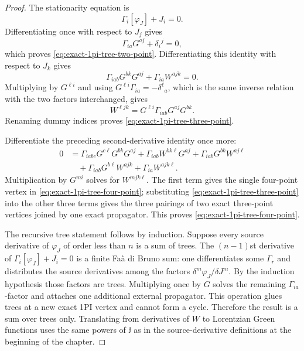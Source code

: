 \begin{proof}
The stationarity equation is
\[
  \Gamma_i[\varphi_J]+J_i=0.
\]
Differentiating once with respect to \(J_j\) gives
\[
  \Gamma_{ia}G^{aj}+\delta_i{}^j=0,
\]
which proves \eqref{eq:exact-1pi-tree-two-point}.  Differentiating this
identity with respect to \(J_k\) gives
\[
  \Gamma_{iab}G^{bk}G^{aj}
  +
  \Gamma_{ia}W^{ajk}
  =
  0 .
\]
Multiplying by \(G^{\ell i}\) and using
\(G^{\ell i}\Gamma_{ia}=-\delta^\ell{}_a\), which is the same inverse
relation with the two factors interchanged, gives
\[
  W^{\ell jk}
  =
  G^{\ell i}\Gamma_{iab}G^{aj}G^{bk}.
\]
Renaming dummy indices proves
\eqref{eq:exact-1pi-tree-three-point}.

Differentiate the preceding second-derivative identity once more:
\[
\begin{aligned}
  0
  &=
  \Gamma_{iabc}G^{c\ell}G^{bk}G^{aj}
  +
  \Gamma_{iab}W^{bk\ell}G^{aj}
  +
  \Gamma_{iab}G^{bk}W^{aj\ell}
\\
  &\quad
  +
  \Gamma_{iab}G^{b\ell}W^{ajk}
  +
  \Gamma_{ia}W^{ajk\ell}.
\end{aligned}
\]
Multiplication by \(G^{mi}\) solves for \(W^{mjk\ell}\).  The first term gives
the single four-point vertex in
\eqref{eq:exact-1pi-tree-four-point}; substituting
\eqref{eq:exact-1pi-tree-three-point} into the other three terms gives the
three pairings of two exact three-point vertices joined by one exact
propagator.  This proves \eqref{eq:exact-1pi-tree-four-point}.

The recursive tree statement follows by induction.  Suppose every source
derivative of \(\varphi_J\) of order less than \(n\) is a sum of trees.  The
\((n-1)\)st derivative of
\(\Gamma_i[\varphi_J]+J_i=0\) is a finite Fa\`a di Bruno sum: one differentiates
some \(\Gamma_r\) and distributes the source derivatives among the factors
\(\delta^{m}\varphi_J/\delta J^m\).  By the induction hypothesis those
factors are trees.  Multiplying once by \(G\) solves the remaining
\(\Gamma_{ia}\)-factor and attaches one additional external propagator.  This
operation glues trees at a new exact 1PI vertex and cannot form a cycle.
Therefore the result is a sum over trees only.  Translating from derivatives
of \(W\) to Lorentzian Green functions uses the same powers of \(\ii\) as in
the source-derivative definitions at the beginning of the chapter.
\end{proof}

